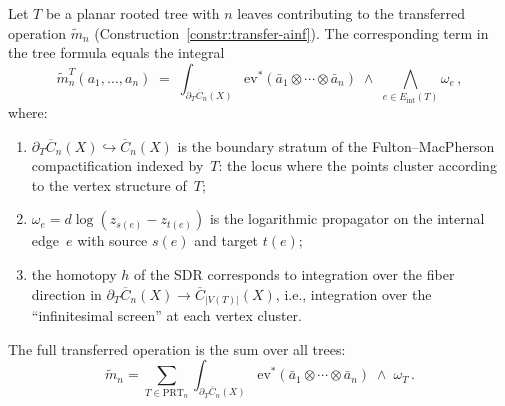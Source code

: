 \begin{proposition}
\label{prop:trees-boundary-strata}
Let $T$ be a planar rooted tree with $n$ leaves contributing to the
transferred operation $\tilde{m}_n$
(Construction~\ref{constr:transfer-ainf}).  The corresponding
term in the tree formula equals the integral
\[
\tilde{m}_n^T(a_1, \ldots, a_n) \;=\;
\int_{\partial_T \overline{C}_n(X)}
\mathrm{ev}^*(\bar{a}_1 \otimes \cdots \otimes \bar{a}_n)
\;\wedge\;
\bigwedge_{e \in E_{\mathrm{int}}(T)} \omega_e\,,
\]
where:
\begin{enumerate}[label=(\roman*)]
\item $\partial_T \overline{C}_n(X) \hookrightarrow
\overline{C}_n(X)$ is the boundary stratum of the
Fulton--MacPherson compactification indexed by~$T$: the locus
where the points cluster according to the vertex structure of~$T$;
\item $\omega_e = d\log(z_{s(e)} - z_{t(e)})$ is the logarithmic
propagator on the internal edge~$e$ with source $s(e)$ and
target $t(e)$;
\item the homotopy $h$ of the SDR corresponds to integration over
the fiber direction in $\partial_T\overline{C}_n(X) \to
\overline{C}_{|V(T)|}(X)$, i.e., integration over the
``infinitesimal screen'' at each vertex cluster.
\end{enumerate}
The full transferred operation is the sum over all trees:
\[
\tilde{m}_n = \sum_{T \in \mathrm{PRT}_n}
\int_{\partial_T \overline{C}_n(X)}
\mathrm{ev}^*(\bar{a}_1 \otimes \cdots \otimes \bar{a}_n)
\;\wedge\;\omega_T\,.
\]
\end{proposition}

